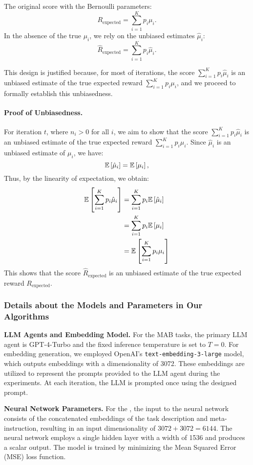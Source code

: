The original score with the Bernoulli parameters:
\[
R_{\text{expected}} = \sum_{i=1}^{K} p_i \mu_i.
\]
In the absence of the true \( \mu_i \), we rely on the unbiased estimates \( \hat{\mu}_i \):
\[
\hat{R}_{\text{expected}} = \sum_{i=1}^{K} p_i \hat{\mu}_i.
\]

This design is justified because, for most of iterations, the score \( \sum_{i=1}^K p_i \hat{\mu}_i \) is an unbiased estimate of the true expected reward \( \sum_{i=1}^K p_i \mu_i \), and we proceed to formally establish this unbiasedness.

\paragraph{Proof of Unbiasedness.}
For iteration \( t \), where \( n_i > 0 \) for all \( i \), we aim to show that the score \( \sum_{i=1}^K p_i \hat{\mu}_i \) is an unbiased estimate of the true expected reward \( \sum_{i=1}^K p_i \mu_i \). Since \( \hat{\mu}_i \) is an unbiased estimate of \( \mu_i \), we have:
\[
\mathbb{E}\left[ \hat{\mu}_i \right] = \mathbb{E}\left[ \mu_i \right],
\]
Thus, by the linearity of expectation, we obtain:
\begin{align*}
    \mathbb{E}\left[ \sum_{i=1}^K p_i \hat{\mu}_i \right] &= \sum_{i=1}^K p_i \mathbb{E}\left[ \hat{\mu}_i \right] \\
    &= \sum_{i=1}^K p_i \mathbb{E}\left[ \mu_i \right] \\
    &= \mathbb{E}\left[ \sum_{i=1}^K p_i \mu_i \right]
\end{align*}
This shows that the score $\hat{R}_{\text{expected}}$ is an unbiased estimate of the true expected reward $R_{\text{expected}}$.



\subsubsection{Details about the Models and Parameters in Our Algorithms}
\textbf{LLM Agents and Embedding Model.}
For the MAB tasks, the primary LLM agent is 
GPT-4-Turbo
and the fixed inference temperature is set to \(T=0\). For embedding generation, we employed OpenAI's \texttt{text-embedding-3-large} model, which outputs embeddings with a dimensionality of 3072. These embeddings are utilized to represent the prompts provided to the LLM agent during the experiments. At each iteration, the LLM is prompted once using the designed prompt.

\textbf{Neural Network Parameters.}
For the \alg, the input to the neural network consists of the concatenated embeddings of the task description and meta-instruction, resulting in an input dimensionality of \(3072 + 3072 = 6144\). The neural network employs a single hidden layer with a width of 1536 and produces a scalar output. The model is trained by minimizing the Mean Squared Error (MSE) loss function.

